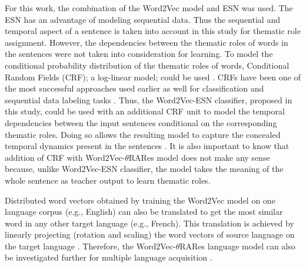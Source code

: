 For this work, the combination of the Word2Vec model and ESN was used. The ESN has an advantage of modeling sequential data. Thus the sequential and temporal aspect of a sentence is taken into account in this study for thematic role assignment. However, the dependencies between the thematic roles of words in the sentences were not taken into consideration for learning. To model the conditional probability distribution of the thematic roles of words, Conditional Random Fields (CRF); a log-linear model; could be used \cite{crf:intro:sutton}. CRFs have been one of the most successful approaches used earlier as well for classification and sequential data labeling tasks \cite{end-to-end, esn:esn_crf}. Thus, the Word2Vec-ESN classifier, proposed in this study, could be used with an additional CRF unit to model the temporal dependencies between the input sentences conditional on the corresponding thematic roles. Doing so allows the resulting model to capture the concealed temporal dynamics present in the sentences \cite{esn:esn_crf}. It is also important to know that addition of CRF with Word2Vec-$\theta$RARes model does not make any sense because, unlike Word2Vec-ESN classifier, the model takes the meaning of the whole sentence as teacher output to learn thematic roles. 

Distributed word vectors obtained by training the Word2Vec model on one language corpus (e.g., English) can also be translated to get the most similar word in any other target language (e.g., French). This translation is achieved by linearly projecting (rotation and scaling) the word vectors of source language on the target language \cite{w2v:language_similarities}. Therefore, the Word2Vec-$\theta$RARes language model can also be investigated further for multiple language acquisition \cite{hinaut_multiple_lang}. 